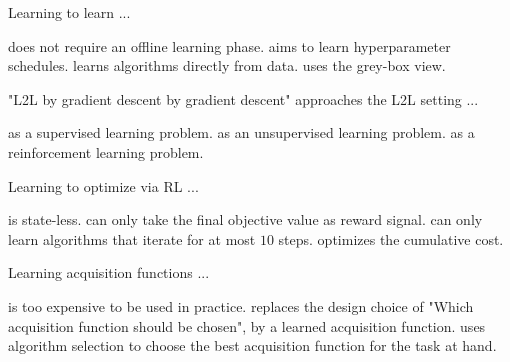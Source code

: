 \documentclass{exam}
\begin{document}
\begin{questions}
\question Learning to learn ...
\begin{choices}
    \choice does not require an offline learning phase.
    \choice aims to learn hyperparameter schedules.
    \choice learns algorithms directly from data. %
    \choice uses the grey-box view.
\end{choices}

\question "L2L by gradient descent by gradient descent" approaches the L2L setting ...
\begin{choices}
    \choice as a supervised learning problem. %
    \choice as an unsupervised learning problem.
    \choice as a reinforcement learning problem.
\end{choices}

\question Learning to optimize via RL ...
\begin{choices}
    \choice is state-less.
    \choice can only take the final objective value as reward signal.
    \choice can only learn algorithms that iterate for at most $10$ steps.
    \choice optimizes the cumulative cost. %
\end{choices}

\question Learning acquisition functions ...
\begin{choices}
    \choice is too expensive to be used in practice.
    \choice replaces the design choice of "Which acquisition function should be chosen", by a learned acquisition function. %
    \choice uses algorithm selection to choose the best acquisition function for the task at hand.
\end{choices}
	\end{questions}
\end{document}
